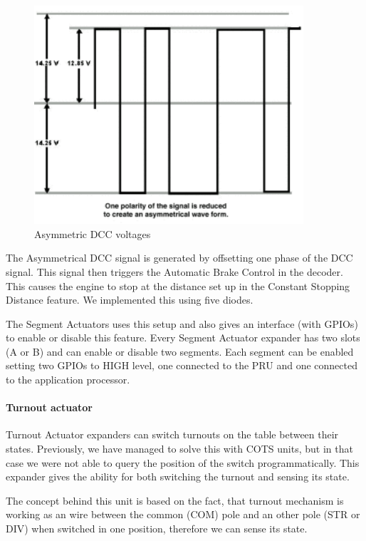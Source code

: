 \begin{figure}[!h]
	\centering
	\includegraphics[width=100mm]{figures/modes3/DCC.png}
	\caption{Asymmetric DCC voltages}
	\label{fig:dcc}
\end{figure}

The Asymmetrical DCC signal is generated by offsetting one phase of the DCC signal. This signal then triggers the Automatic Brake Control in the decoder. This causes the engine to stop at the distance set up in the Constant Stopping Distance feature. We implemented this using five diodes. %

The Segment Actuators uses this setup and also gives an interface (with GPIOs) to enable or disable this feature. Every Segment Actuator expander has two slots (A or B) and can enable or disable two segments. Each segment can be enabled setting two GPIOs to HIGH level, one connected to the PRU and one connected to the application processor.

\paragraph{Turnout actuator}
Turnout Actuator expanders can switch turnouts on the table between their states. Previously, we have managed to solve this with COTS units, but in that case we were not able to query the position of the switch programmatically. This expander gives the ability for both switching the turnout and sensing its state.

The concept behind this unit is based on the fact, that turnout mechanism is working as an wire between the common (COM) pole and an other pole (STR or DIV) when switched in one position, therefore we can sense its state.

